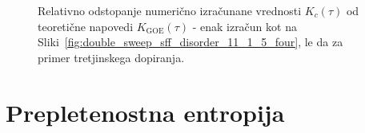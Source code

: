  \begin{figure}[H]
\caption{Relativno odstopanje numerično izračunane vrednosti $K_c(\tau)$ od teoretične napovedi $K_\mathrm{GOE}(\tau)$ - enak izračun kot na Sliki~\ref{fig:double_sweep_sff_disorder_11_1_5_four}, le da za primer tretjinskega dopiranja. }
\label{fig:double_sweep_sff_disorder_9_3_3_four}
\end{figure}

\chapter{Prepletenostna entropija}
\label{prepletenostna_numericno}
